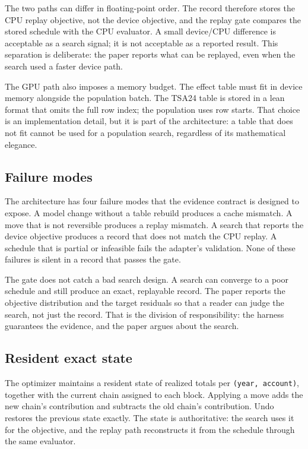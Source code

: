 \documentclass[preprint,11pt]{elsarticle}
\begin{document}
The two paths can differ in floating-point order. The record therefore stores the CPU replay objective,
not the device objective, and the replay gate compares the stored schedule with the CPU evaluator. A
small device/CPU difference is acceptable as a search signal; it is not acceptable as a reported
result. This separation is deliberate: the paper reports what can be replayed, even when the search
used a faster device path.

The GPU path also imposes a memory budget. The effect table must fit in device memory alongside the
population batch. The TSA24 table is stored in a lean format that omits the full row index; the
population uses row starts. That choice is an implementation detail, but it is part of the architecture:
a table that does not fit cannot be used for a population search, regardless of its mathematical
elegance.

\subsection{Failure modes}

The architecture has four failure modes that the evidence contract is designed to expose. A model
change without a table rebuild produces a cache mismatch. A move that is not reversible produces a
replay mismatch. A search that reports the device objective produces a record that does not match the
CPU replay. A schedule that is partial or infeasible fails the adapter's validation. None of these
failures is silent in a record that passes the gate.

The gate does not catch a bad search design. A search can converge to a poor schedule and still
produce an exact, replayable record. The paper reports the objective distribution and the target
residuals so that a reader can judge the search, not just the record. That is the division of
responsibility: the harness guarantees the evidence, and the paper argues about the search.

\subsection{Resident exact state}\label{resident-exact-state}

The optimizer maintains a resident state of realized totals per \texttt{(year,\ account)}, together with the current chain assigned to each block. Applying a move adds the new chain's contribution and subtracts the old chain's contribution. Undo restores the previous state exactly. The state is authoritative: the search uses it for the objective, and the replay path reconstructs it from the schedule through the same evaluator.
\end{document}
